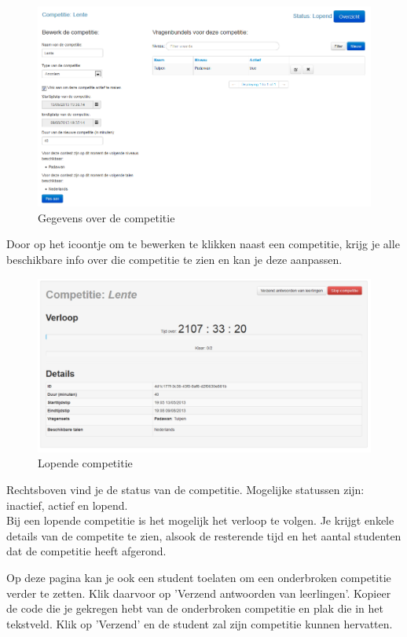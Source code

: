 \documentclass[]{article}
\begin{document}
\begin{figure}[!ht]
	\centering
	\includegraphics[width=1\textwidth]{img/compinfo}
	\caption{Gegevens over de competitie}
	\label{compinfo}
\end{figure}

Door op het icoontje om te bewerken te klikken naast een competitie, krijg je alle beschikbare info over die competitie te zien en kan je deze aanpassen.

\begin{figure}[!ht]
	\centering
	\includegraphics[width=1\textwidth]{img/comprun}
	\caption{Lopende competitie}
	\label{comprun}
\end{figure}

Rechtsboven vind je de status van de competitie. Mogelijke statussen zijn: inactief, actief en lopend. \\
Bij een lopende competitie is het mogelijk het verloop te volgen. Je krijgt enkele details van de competite te zien, alsook de resterende tijd en het aantal studenten dat de competitie heeft afgerond. 

Op deze pagina kan je ook een student toelaten om een onderbroken competitie verder te zetten. Klik daarvoor op 'Verzend antwoorden van leerlingen'. Kopieer de code die je gekregen hebt van de onderbroken competitie en plak die in het tekstveld. Klik op 'Verzend' en de student zal zijn competitie kunnen hervatten.
\end{document}
